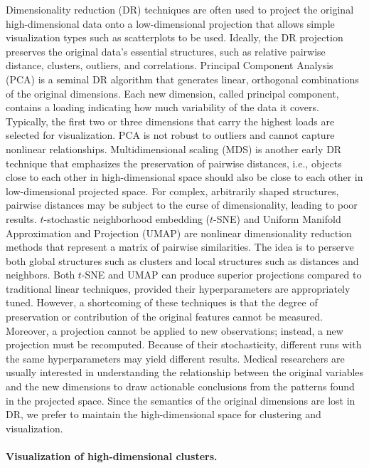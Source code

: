 \documentclass[
  oneside]{book}
\begin{document}
Dimensionality reduction (DR) techniques are often used to project the original high-dimensional data onto a low-dimensional projection that allows simple visualization types such as scatterplots to be used.
Ideally, the DR projection preserves the original data's essential structures, such as relative pairwise distance, clusters, outliers, and correlations.
Principal Component Analysis \autocite{Hotelling:PCA1933} (PCA) is a seminal DR algorithm that generates linear, orthogonal combinations of the original dimensions.
Each new dimension, called principal component, contains a loading indicating how much variability of the data it covers.
Typically, the first two or three dimensions that carry the highest loads are selected for visualization.
PCA is not robust to outliers and cannot capture nonlinear relationships.
Multidimensional scaling \autocite{Gower:MDS1966} (MDS) is another early DR technique that emphasizes the preservation of pairwise distances, i.e., objects close to each other in high-dimensional space should also be close to each other in low-dimensional projected space.
For complex, arbitrarily shaped structures, pairwise distances may be subject to the curse of dimensionality, leading to poor results.
\(t\)-stochastic neighborhood embedding \autocite{VanDerMaaten:tSNE2008} (\(t\)-SNE) and Uniform Manifold Approximation and Projection \autocite{mcinnes2018umap} (UMAP) are nonlinear dimensionality reduction methods that represent a matrix of pairwise similarities.
The idea is to perserve both global structures such as clusters and local structures such as distances and neighbors.
Both \(t\)-SNE and UMAP can produce superior projections compared to traditional linear techniques, provided their hyperparameters are appropriately tuned.
However, a shortcoming of these techniques is that the degree of preservation or contribution of the original features cannot be measured.
Moreover, a projection cannot be applied to new observations; instead, a new projection must be recomputed.
Because of their stochasticity, different runs with the same hyperparameters may yield different results.
Medical researchers are usually interested in understanding the relationship between the original variables and the new dimensions to draw actionable conclusions from the patterns found in the projected space.
Since the semantics of the original dimensions are lost in DR, we prefer to maintain the high-dimensional space for clustering and visualization.

\paragraph*{Visualization of high-dimensional clusters.}
\end{document}
